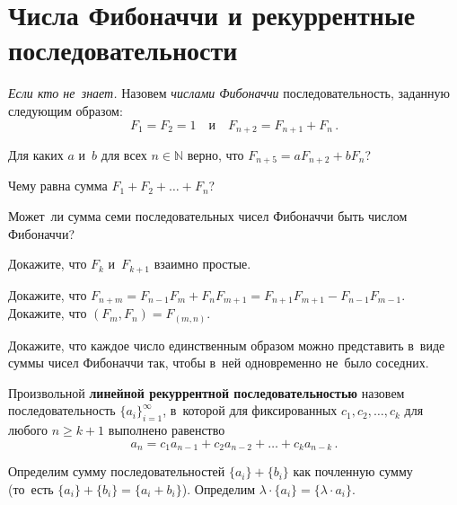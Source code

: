 
\section*{Числа Фибоначчи и рекуррентные последовательности}


\emph{Если кто не~знает.}
Назовем \emph{числами Фибоначчи} последовательность, заданную следующим
образом:
\[
    F_1 = F_2 = 1
\quad\text{и}\quad
    F_{n+2} = F_{n+1} + F_{n}
\, . \]

\begin{problems}

\item
Для каких $a$ и~$b$ для всех $n \in \mathbb{N}$ верно, что\enspace
$F_{n+5} = aF_{n+2} + b F_n$?

\item
Чему равна сумма\enspace
$F_1 + F_2 + \ldots + F_n$?

\item
Может~ли сумма семи последовательных чисел Фибоначчи быть числом Фибоначчи?

\item
Докажите, что $F_{k}$ и~$F_{k+1}$ взаимно простые.

\item
\subproblem
Докажите, что\enspace
\(
    F_{n+m}
=
    F_{n-1} F_m + F_n F_{m+1}
=
    F_{n+1} F_{m+1} - F_{n-1} F_{m-1}
\).
\\
\subproblem
Докажите, что\enspace
$(F_{m}, F_{n}) = F_{(m, n)}$.

\item
Докажите, что каждое число единственным образом можно представить в~виде суммы
чисел Фибоначчи так, чтобы в~ней одновременно не~было соседних.

\end{problems}

Произвольной \textbf{линейной рекуррентной последовательностью} назовем
последовательность $\{ a_i \}_{i=1}^\infty$, в~которой для фиксированных
$c_1, c_2, \ldots, c_k$ для любого $n \geq k + 1$ выполнено равенство
\[
    a_{n} = c_1 a_{n-1} + c_2 a_{n-2} + \ldots + c_k a_{n-k}
\, . \]

Определим сумму последовательностей $\{ a_i \} + \{ b_i \}$ как почленную сумму
(то~есть $\{ a_i \} + \{ b_i \} = \{ a_i + b_i \}$).
Определим $\lambda \cdot \{ a_i \} = \{ \lambda \cdot a_i \}$.

